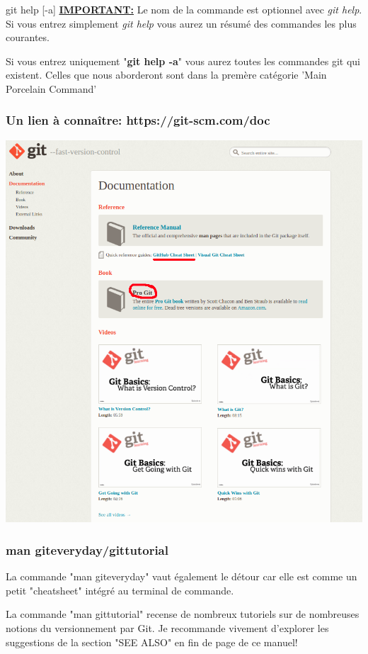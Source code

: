 \documentclass{beamer}
\begin{document}
\begin{frame}{git help [-a]}
\textbf{\underline{IMPORTANT:}} Le nom de la commande est optionnel avec \textit{git help}. Si vous entrez simplement \textit{git help} vous aurez un résumé des commandes les plus courantes.\\
\medskip

Si vous entrez uniquement "\textbf{git help -a}" vous aurez toutes les commandes git qui existent. Celles que nous aborderont sont dans la premère catégorie 'Main Porcelain Command'
\end{frame}

\begin{frame}
\frametitle{Un lien à connaître: https://git-scm.com/doc}
\begin{center}
    \includegraphics[scale=0.3]{images/git_ressources/doc.png}
\end{center}
\end{frame}

\begin{frame}
\frametitle{man giteveryday/gittutorial}
La commande "man giteveryday" vaut également le détour car elle est comme un petit "cheatsheet" intégré au terminal de commande.
\bigskip

La commande "man gittutorial" recense de nombreux tutoriels sur de nombreuses notions du versionnement par Git. Je recommande vivement d'explorer les suggestions de la section "SEE ALSO" en fin de page de ce manuel!
\end{frame}
\end{document}
